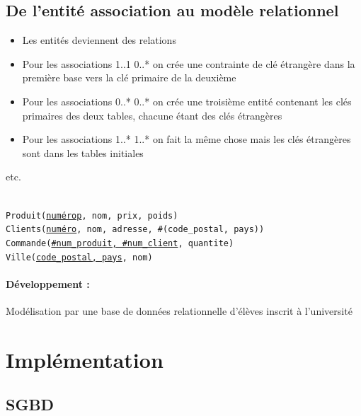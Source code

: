\subsection{De l'entité association au modèle relationnel}

\begin{algo}
	\begin{itemize}[label=$\star$]
		\item Les entités deviennent des relations
		
		\item Pour les associations 1..1 0..* on crée une contrainte de clé étrangère dans la première base vers la clé primaire de la deuxième
		
		\item Pour les associations 0..*  0..* on crée une troisième entité contenant les clés primaires des deux tables, chacune étant des clés étrangères
		
		\item Pour les associations 1..*   1..* on fait la même chose mais les clés étrangères sont dans les tables initiales
		
	\end{itemize}
	
	etc.
\end{algo}

\begin{example}\\
	\texttt{Produit(\underline{numérop}, nom, prix, poids)}\\
	\texttt{Clients(\underline{numéro}, nom, adresse, \#(code\_postal, pays))}\\
	\texttt{Commande(\underline{\#num\_produit, \#num\_client}, quantite)}\\
	\texttt{Ville(\underline{code\_postal, pays}, nom)}
\end{example}

\paragraph{Développement :} Modélisation par une base de données relationnelle d'élèves inscrit à l'université

\section{Implémentation}

\subsection{SGBD}

